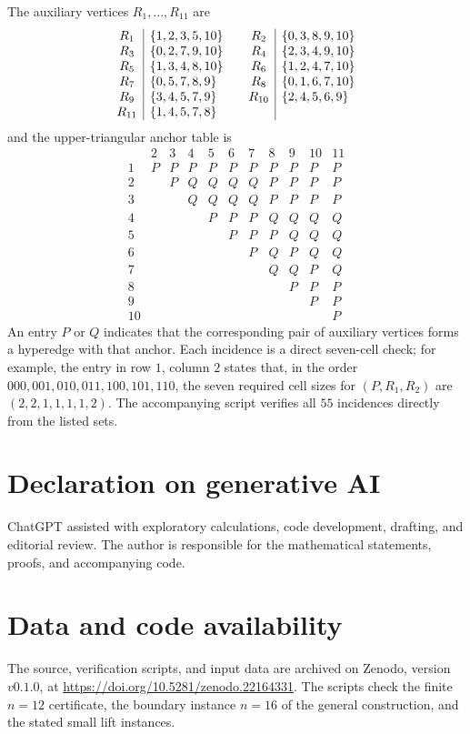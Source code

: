 \documentclass[11pt]{article}
\begin{document}
The auxiliary vertices \(R_1,\ldots,R_{11}\) are
\[
\begin{array}{c|l@{\qquad}c|l}
R_1&\{1,2,3,5,10\}&R_2&\{0,3,8,9,10\}\\
R_3&\{0,2,7,9,10\}&R_4&\{2,3,4,9,10\}\\
R_5&\{1,3,4,8,10\}&R_6&\{1,2,4,7,10\}\\
R_7&\{0,5,7,8,9\}&R_8&\{0,1,6,7,10\}\\
R_9&\{3,4,5,7,9\}&R_{10}&\{2,4,5,6,9\}\\
R_{11}&\{1,4,5,7,8\}&&
\end{array}
\]
and the upper-triangular anchor table is
\[
\begin{array}{c|cccccccccc}
 &2&3&4&5&6&7&8&9&10&11\\ \hline
1&P&P&P&P&P&P&P&P&P&P\\
2& &P&Q&Q&Q&Q&P&P&P&P\\
3& & &Q&Q&Q&Q&P&P&P&P\\
4& & & &P&P&P&Q&Q&Q&Q\\
5& & & & &P&P&P&Q&Q&Q\\
6& & & & & &P&Q&P&Q&Q\\
7& & & & & & &Q&Q&P&Q\\
8& & & & & & & &P&P&P\\
9& & & & & & & & &P&P\\
10& & & & & & & & & &P
\end{array}
\]
An entry \(P\) or \(Q\) indicates that the corresponding pair of auxiliary
vertices forms a hyperedge with that anchor.  Each incidence is a direct
seven-cell check; for example, the entry in row \(1\), column \(2\) states
that, in the order \(000,001,010,011,100,101,110\), the seven required cell
sizes for \((P,R_1,R_2)\) are \((2,2,1,1,1,1,2)\).  The accompanying script
verifies all \(55\) incidences directly from the listed sets.

\section*{Declaration on generative AI}

ChatGPT assisted with exploratory calculations, code development, drafting,
and editorial review.  The author is responsible for the mathematical
statements, proofs, and accompanying code.

\section*{Data and code availability}

The source, verification scripts, and input data are archived on Zenodo,
version \(v0.1.0\), at
\url{https://doi.org/10.5281/zenodo.22164331}.  The scripts check the finite
\(n=12\) certificate, the boundary instance \(n=16\) of the general
construction, and the stated small lift instances.



\end{document}
